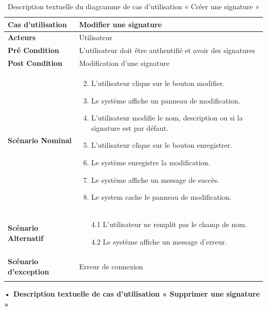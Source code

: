 \begin{longtable}{|p{5cm}|p{10cm}|}
\hline
\textbf{Cas d'utilisation}&Modifier une signature\\
\hline
\textbf{Acteurs}&Utilisateur\\
\hline
\textbf{Pré Condition}&L'utilisateur doit être authentifié et avoir des signatures\\
\hline
\textbf{Post Condition}&Modification d'une signature\\
\hline
\textbf{Scénario Nominal}&
\vspace{-\baselineskip}
\begin{enumerate}
    \setcounter{enumi}{1}
  \item L'utilisateur clique sur le bouton modifier.
  \item Le système affiche un panneau de modification.
  \item L'utilisateur modifie le nom, description ou si la signature est par défaut.
  \item L'utilisateur clique sur le bouton enregistrer.
  \item Le système enregistre la modification.
  \item Le système affiche un message de succès.
  \item Le system cache le panneau de modification.
\end{enumerate}\\
\hline
\textbf{Scénario Alternatif}&
\vspace{-\baselineskip}
\begin{enumerate}
      \item [4.1] L'utilisateur ne remplit pas le champ de nom.
      \item [4.2] Le système affiche un message d'erreur.
\end{enumerate}\\
\hline
\textbf{Scénario d'exception}&Erreur de connexion\\
\hline
\caption{Description textuelle du diagramme de cas d'utilisation « Créer une signature »}
\label{tab:use_case_update_signature}
\end{longtable}


\textbf{•	Description textuelle de cas d'utilisation « Supprimer une signature »}


